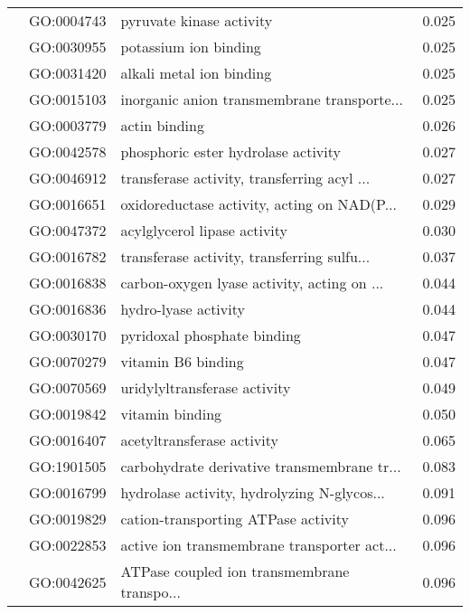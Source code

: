 \begin{longtable}{lllr}
   & GO:0004743 &                     pyruvate kinase activity &         0.025 \\
   & GO:0030955 &                        potassium ion binding &         0.025 \\
   & GO:0031420 &                     alkali metal ion binding &         0.025 \\
   & GO:0015103 &  inorganic anion transmembrane transporte... &         0.025 \\
   & GO:0003779 &                                actin binding &         0.026 \\
   & GO:0042578 &          phosphoric ester hydrolase activity &         0.027 \\
   & GO:0046912 &  transferase activity, transferring acyl ... &         0.027 \\
   & GO:0016651 &  oxidoreductase activity, acting on NAD(P... &         0.029 \\
   & GO:0047372 &                 acylglycerol lipase activity &         0.030 \\
   & GO:0016782 &  transferase activity, transferring sulfu... &         0.037 \\
   & GO:0016838 &  carbon-oxygen lyase activity, acting on ... &         0.044 \\
   & GO:0016836 &                         hydro-lyase activity &         0.044 \\
   & GO:0030170 &                  pyridoxal phosphate binding &         0.047 \\
   & GO:0070279 &                           vitamin B6 binding &         0.047 \\
   & GO:0070569 &                 uridylyltransferase activity &         0.049 \\
   & GO:0019842 &                              vitamin binding &         0.050 \\
   & GO:0016407 &                   acetyltransferase activity &         0.065 \\
   & GO:1901505 &  carbohydrate derivative transmembrane tr... &         0.083 \\
   & GO:0016799 &  hydrolase activity, hydrolyzing N-glycos... &         0.091 \\
   & GO:0019829 &          cation-transporting ATPase activity &         0.096 \\
   & GO:0022853 &  active ion transmembrane transporter act... &         0.096 \\
   & GO:0042625 &  ATPase coupled ion transmembrane transpo... &         0.096 \\
\end{longtable}
